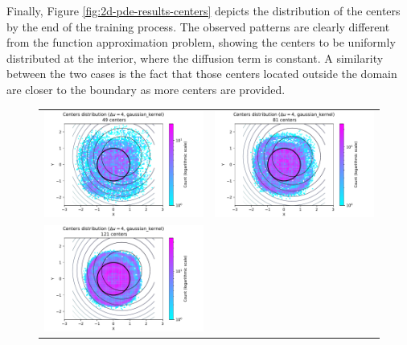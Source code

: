 \documentclass[12pt]{report} %
\begin{document}
Finally, Figure \ref{fig:2d-pde-results-centers} depicts the distribution of the centers by the end of the training process. The observed patterns are clearly different from the function approximation problem, showing the centers to be uniformly distributed at the interior, where the diffusion term is constant. A similarity between the two cases is the fact that those centers located outside the domain are closer to the boundary as more centers are provided.

\begin{figure}[h]
  \hspace*{-2cm}
  \begin{tabular}{cc}
    \includegraphics[width=.6\textwidth]{imagenes/experiments/2d/pde_parabola/circle_c49_pde_gaussian_kernel.pdf}  &
    \includegraphics[width=.6\textwidth]{imagenes/experiments/2d/pde_parabola/circle_c81_pde_gaussian_kernel.pdf}    \\
    \includegraphics[width=.6\textwidth]{imagenes/experiments/2d/pde_parabola/circle_c121_pde_gaussian_kernel.pdf} &

\end{tabular}
\end{figure}
\end{document}
